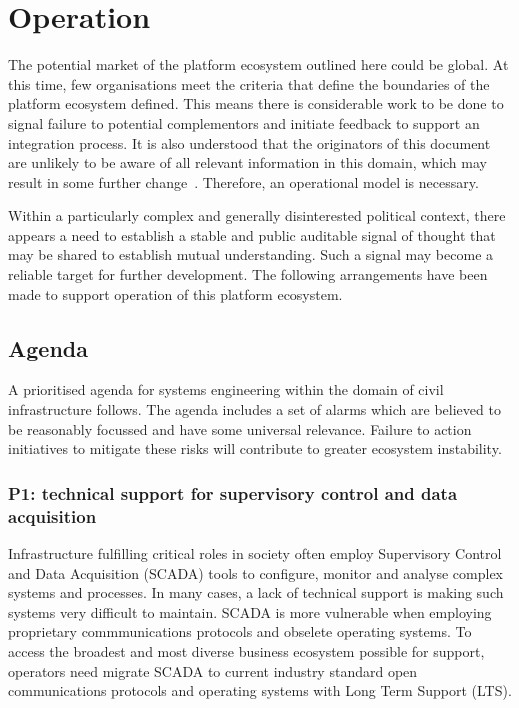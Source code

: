 \documentclass[11pt, oneside]{article}   	%
\begin{document}
\pagebreak

\section{Operation}
The potential market of the platform ecosystem outlined here could be global.
At this time, few organisations meet the criteria that define the boundaries of the platform ecosystem defined.
This means there is considerable work to be done to signal failure to potential complementors and initiate feedback to support an integration process.
It is also understood that the originators of this document are unlikely to be aware of all relevant information in this domain, which may result in some further change~\cite{ont1}.
Therefore, an operational model is necessary.\

Within a particularly complex and generally disinterested political context, there appears a need to establish a stable and public auditable signal of thought that may be shared to establish mutual understanding.
Such a signal may become a reliable target for further development.
The following arrangements have been made to support operation of this platform ecosystem.\

\subsection{Agenda}
A prioritised agenda for systems engineering within the domain of civil infrastructure follows.
The agenda includes a set of alarms which are believed to be reasonably focussed and have some universal relevance.
Failure to action initiatives to mitigate these risks will contribute to greater ecosystem instability.

\subsubsection{P1: technical support for supervisory control and data acquisition}

Infrastructure fulfilling critical roles in society often employ Supervisory Control and Data Acquisition (SCADA) tools to configure, monitor and analyse complex systems and processes.
In many cases, a lack of technical support is making such systems very difficult to maintain.
SCADA is more vulnerable when employing proprietary commmunications protocols and obselete operating systems.
To access the broadest and most diverse business ecosystem possible for support, operators need migrate SCADA to current industry standard open communications protocols and operating systems with Long Term Support (LTS).
\end{document}
